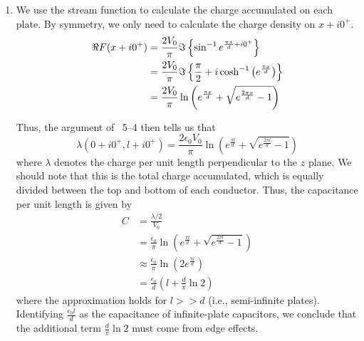 \begin{enumerate}[wide, labelindent = 0pt, label = (\alph*)]
\item
We use the stream function to calculate the charge accumulated on each plate.
By symmetry, we only need to calculate the charge density on $x + i0^+$.
\begin{align*}
    \Re F(x + i0^+)
    &= \frac{2V_0}{\pi} \Im\left\{ \sin^{-1} e^{\frac{\pi x}{d} + i0^+} \right\} \\
    &= \frac{2V_0}{\pi} \Im\left\{
        \frac{\pi}{2} + i\cosh^{-1} \left( e^{\frac{\pi x}{d}} \right)
    \right\} \\
    &= \frac{2V_0}{\pi} \ln \left( e^{\frac{\pi x}{d}} + \sqrt{e^{\frac{2\pi x}{d}} - 1} \right)
\end{align*}

Thus, the argument of ~5--4 then tells us that
\[
    \lambda(0 + i0^+, l + i0^+)
    = \frac{2\epsilon_0 V_0}{\pi} \ln \left( e^{\frac{\pi l}{d}} + \sqrt{e^{\frac{2\pi l}{d}} - 1} \right)
\]
where $\lambda$ denotes the charge per unit length perpendicular to the $z$ plane.
We should note that this is the total charge accumulated,
which is equally divided between the top and bottom of each conductor.
Thus, the capacitance per unit length is given by
\begin{align*}
    C
    &= \frac{\lambda / 2}{V_0} \\
    &= \frac{\epsilon_0}{\pi} \ln \left(
        e^{\frac{\pi l}{d}} + \sqrt{e^{\frac{2\pi l}{d}} - 1}
    \right) \\
    &\approx \frac{\epsilon_0}{\pi} \ln \left( 2e^{\frac{\pi l}{d}} \right) \\
    &= \frac{\epsilon_0}{d} \left( l + \frac{d}{\pi}\ln 2 \right)
\end{align*}
where the approximation holds for $l >> d$ (i.e., semi-infinite plates).
Identifying $\frac{\epsilon_0 l}{d}$ as the capacitance of infinite-plate capacitors,
we conclude that the additional term $\frac{d}{\pi}\ln 2$ must come from edge effects.

\end{enumerate}
